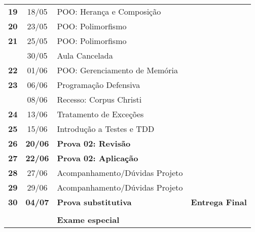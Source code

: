 \documentclass[11pt]{article}
\begin{document}
\begin{center}
\begin{tabular}{>{\bfseries}ccl>{\bfseries}c}
19 & 18/05 & POO: Herança e Composição & \\[0pt]
20 & 23/05 & POO: Polimorfismo & \\[0pt]
21 & 25/05 & POO: Polimorfismo & \\[0pt]
\rowcolor{green!40} & 30/05 & Aula Cancelada & \\[0pt]
22 & 01/06 & POO: Gerenciamento de Memória & \\[0pt]
23 & 06/06 & Programação Defensiva & \\[0pt]
\rowcolor{green!40} & 08/06 & Recesso: Corpus Christi & \\[0pt]
24 & 13/06 & Tratamento de Exceções & \\[0pt]
25 & 15/06 & Introdução a Testes e TDD & \\[0pt]
\rowcolor{yellow!50} 26 & \textbf{20/06} & \textbf{Prova 02: Revisão} & \\[0pt]
\rowcolor{yellow!50} 27 & \textbf{22/06} & \textbf{Prova 02: Aplicação} & \\[0pt]
28 & 27/06 & Acompanhamento/Dúvidas Projeto & \\[0pt]
29 & 29/06 & Acompanhamento/Dúvidas Projeto & \\[0pt]
\rowcolor{yellow!50} 30 & \textbf{04/07} & \textbf{Prova substitutiva} & Entrega Final\\[0pt]
 &  &  & \\[0pt]
\rowcolor{yellow!50} &  & \textbf{Exame especial} & \\[0pt]
\bottomrule
\end{tabular}
\end{center}
\end{document}
